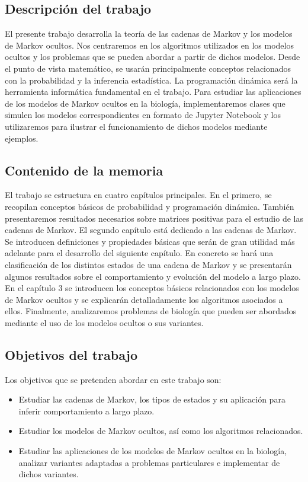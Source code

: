 \subsection*{Descripción del trabajo}
El presente trabajo desarrolla la teoría de las cadenas de Markov y los modelos de Markov ocultos. Nos centraremos en los algoritmos utilizados en los modelos ocultos y los problemas que se pueden abordar a partir de dichos modelos. Desde el punto de vista matemático, se usarán principalmente conceptos relacionados con la probabilidad y la inferencia estadística. La programación dinámica será la herramienta informática fundamental en el trabajo. Para estudiar las aplicaciones de los modelos de Markov ocultos en la biología, implementaremos clases que simulen los modelos correspondientes en formato de Jupyter Notebook y los utilizaremos para ilustrar el funcionamiento de dichos modelos mediante ejemplos.    

\subsection*{Contenido de la memoria}
El trabajo se estructura en cuatro capítulos principales. En el primero, se recopilan conceptos básicos de probabilidad y programación dinámica. También presentaremos resultados necesarios sobre matrices positivas para el estudio de las cadenas de Markov. El segundo capítulo está dedicado a las cadenas de Markov. Se introducen definiciones y propiedades básicas que serán de gran utilidad más adelante para el desarrollo del siguiente capítulo. En concreto se hará una clasificación de los distintos estados de una cadena de Markov y se presentarán algunos resultados sobre el comportamiento y evolución del modelo a largo plazo. En el capítulo $3$ se introducen los conceptos básicos relacionados con los modelos de Markov ocultos y se explicarán detalladamente los algoritmos asociados a ellos. Finalmente, analizaremos problemas de biología que pueden ser abordados mediante el uso de los modelos ocultos o sus variantes.


\subsection*{Objetivos del trabajo}
Los objetivos que se pretenden abordar en este trabajo son:
\begin{itemize}
    \item Estudiar las cadenas de Markov, los tipos de estados y su aplicación para inferir comportamiento a largo plazo.
    \item Estudiar los modelos de Markov ocultos, así como los algoritmos relacionados.
    \item Estudiar las aplicaciones de los modelos de Markov ocultos en la biología, analizar variantes adaptadas a problemas particulares e implementar de dichos variantes.
\end{itemize}
